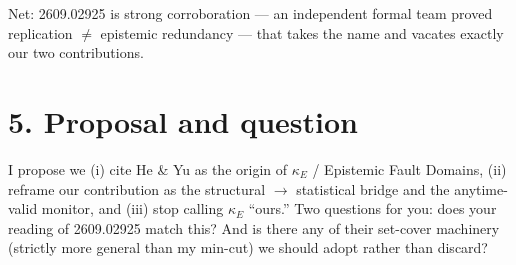 \documentclass[11pt,a4paper]{article}
\begin{document}
\noindent Net: 2609.02925 is strong corroboration --- an independent formal team proved
replication $\ne$ epistemic redundancy --- that takes the name and vacates exactly our
two contributions.

\section*{5. Proposal and question}

I propose we (i) cite He \& Yu as the origin of $\kappa_E$ / Epistemic Fault Domains,
(ii) reframe our contribution as the structural $\to$ statistical bridge and the
anytime-valid monitor, and (iii) stop calling $\kappa_E$ ``ours.'' Two questions for
you: does your reading of 2609.02925 match this? And is there any of their set-cover
machinery (strictly more general than my min-cut) we should adopt rather than discard?
\end{document}
